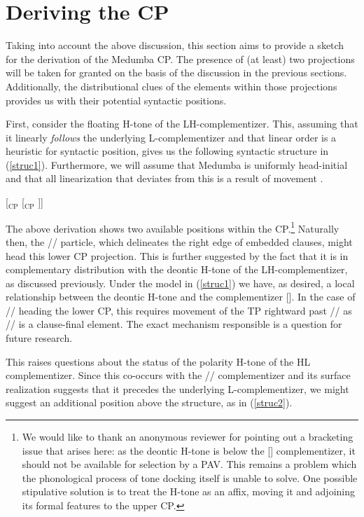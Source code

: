 \documentclass[output=paper,colorlinks,citecolor=brown]{langscibook}
\begin{document}
\section{Deriving the CP}

Taking into account the above discussion, this section aims to provide a sketch for the derivation of the Medumba CP. The presence of (at least) two projections will be taken for granted on the basis of the discussion in the previous sections. Additionally, the distributional clues of the elements within those projections provides us with their potential syntactic positions.

First, consider the floating H-tone of the LH-complementizer. This, assuming that it linearly \textit{follows} the underlying L-complementizer and that linear order is a heuristic for syntactic position, gives us the following syntactic structure in (\ref{struc1}). Furthermore, we will assume that Medumba is uniformly head-initial and that all linearization that deviates from this is a result of movement \citep{Kayne1994}.

\ea \label{struc1}
    {[$_{\text{CP}}$ \text{ {\mbuL} } [$_{\text{CP}}$ ]]}
\z

The above derivation shows two available positions within the CP.\footnote{We would like to thank an anonymous reviewer for pointing out a bracketing issue that arises here: as the deontic H-tone is below the [\mbuL] complementizer, it should not be available for selection by a PAV. This remains a problem which the phonological process of tone docking itself is unable to solve. One possible stipulative solution is to treat the H-tone as an affix, moving it and adjoining its formal features to the upper CP.} Naturally then, the /\la/ particle, which delineates the right edge of embedded clauses, might head this lower CP projection. This is further suggested by the fact that it is in complementary distribution with the deontic H-tone of the LH-complementizer, as discussed previously. Under the model in (\ref{struc1}) we have, as desired, a local relationship between the deontic H-tone and the complementizer [\mbuL]. In the case of /\la/ heading the lower CP, this requires movement of the TP rightward past /\la/ as /\la/ is a clause-final element. The exact mechanism responsible is a question for future research.

This raises questions about the status of the polarity H-tone of the HL complementizer. Since this co-occurs with the /\la/ complementizer and its surface realization suggests that it precedes the underlying L-complementizer, we might suggest an additional position above the structure, as in (\ref{struc2}).
\end{document}
